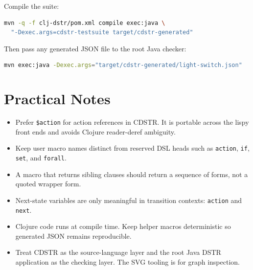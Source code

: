 \documentclass[11pt]{article}
\begin{document}
Compile the suite:

\begin{lstlisting}[language=bash]
mvn -q -f clj-dstr/pom.xml compile exec:java \
  "-Dexec.args=cdstr-testsuite target/cdstr-generated"
\end{lstlisting}

Then pass any generated JSON file to the root Java checker:

\begin{lstlisting}[language=bash]
mvn exec:java -Dexec.args="target/cdstr-generated/light-switch.json"
\end{lstlisting}

\section{Practical Notes}

\begin{itemize}
\item Prefer \texttt{\$action} for action references in CDSTR.  It is portable
  across the lispy front ends and avoids Clojure reader-deref ambiguity.
\item Keep user macro names distinct from reserved DSL heads such as
  \texttt{action}, \texttt{if}, \texttt{set}, and \texttt{forall}.
\item A macro that returns sibling clauses should return a sequence of forms,
  not a quoted wrapper form.
\item Next-state variables are only meaningful in transition contexts:
  \texttt{action} and \texttt{next}.
\item Clojure code runs at compile time.  Keep helper macros deterministic so
  generated JSON remains reproducible.
\item Treat CDSTR as the source-language layer and the root Java DSTR
  application as the checking layer.  The SVG tooling is for graph inspection.
\end{itemize}
\end{document}
